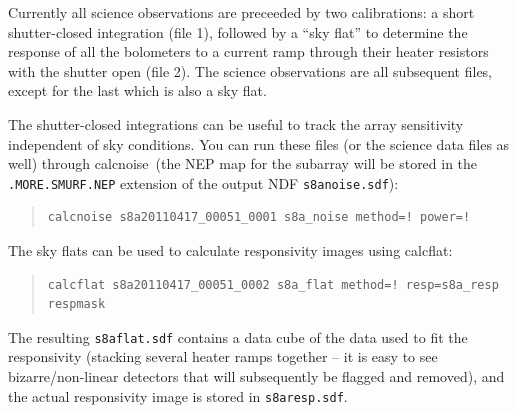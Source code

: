 \documentclass[twoside,11pt]{article}
\newcommand{\xref}[3]{#1}
\renewcommand{\_}{\texttt{\symbol{95}}}
\newenvironment{myquote}{\begin{quote}\begin{small}}{\end{small}\end{quote}}
\newcommand{\task}[1]{\textsf{#1}}
\newcommand{\calcflat}{\xref{\task{calcflat}}{sun258}{CALCFLAT}}
\newcommand{\calcnoise}{\xref{\task{calcnoise}}{sun258}{CALCNOISE}}
\begin{document}
Currently all science observations are preceeded by two calibrations:
a short shutter-closed integration (file 1), followed by a ``sky
flat'' to determine the response of all the bolometers to a current
ramp through their heater resistors with the shutter open (file 2).
The science observations are all subsequent files, except for the last
which is also a sky flat.

The shutter-closed integrations can be useful to track the array
sensitivity independent of sky conditions. You can run these files (or
the science data files as well) through \calcnoise\ (the NEP map for
the subarray will be stored in the \texttt{.MORE.SMURF.NEP} extension
of the output NDF \texttt{s8a\_noise.sdf}):

\begin{myquote}
\begin{verbatim}
calcnoise s8a20110417_00051_0001 s8a_noise method=! power=!
\end{verbatim}
\end{myquote}

The sky flats can be used to calculate responsivity images using
\calcflat:

\begin{myquote}
\begin{verbatim}
calcflat s8a20110417_00051_0002 s8a_flat method=! resp=s8a_resp respmask
\end{verbatim}
\end{myquote}

The resulting \texttt{s8a\_flat.sdf} contains a data cube of the data used
to fit the responsivity (stacking several heater ramps together -- it
is easy to see bizarre/non-linear detectors that will subsequently be
flagged and removed), and the actual responsivity image is stored in
\texttt{s8a\_resp.sdf}.
\end{document}
